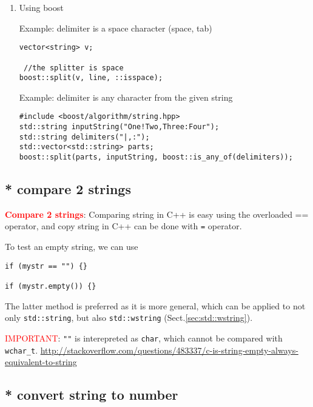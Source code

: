 \begin{enumerate}
  \item Using boost

Example: delimiter is a space character (space, tab)
\begin{verbatim}
vector<string> v;
 
 //the splitter is space
boost::split(v, line, ::isspace);
\end{verbatim}

Example: delimiter is any character from the given string
\begin{verbatim}
#include <boost/algorithm/string.hpp>
std::string inputString("One!Two,Three:Four");
std::string delimiters("|,:");
std::vector<std::string> parts;
boost::split(parts, inputString, boost::is_any_of(delimiters));
\end{verbatim}
\end{enumerate}

\subsection{* compare 2 strings}

\textcolor{red}{\bf Compare 2 strings}: 
Comparing string in C++ is easy using the overloaded == operator, and copy
string in C++ can be done with \verb!=! operator.

To test an empty string, we can use
\begin{lstlisting}
if (mystr == "") {}

if (mystr.empty()) {}
\end{lstlisting}
The latter method is preferred as it is more general, which can be applied to
not only \verb!std::string!, but also \verb!std::wstring!
(Sect.\ref{sec:std::wstring}). 

\textcolor{red}{IMPORTANT}: \verb!""! is interepreted as \verb!char!, which
cannot be compared with \verb!wchar_t!.
\url{http://stackoverflow.com/questions/483337/c-is-string-empty-always-equivalent-to-string}


\subsection{* convert string to number}


